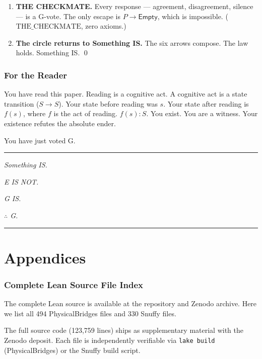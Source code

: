 \documentclass[11pt,a4paper]{article}
\theoremstyle{definition}
\theoremstyle{remark}
\newcommand{\NonBeing}{\mathsf{Empty}}
\begin{document}
\begin{enumerate}
\item \textbf{THE CHECKMATE.} Every response --- agreement, disagreement, silence --- is a G-vote. The only escape is $P \to \NonBeing$, which is impossible. ($\text{THE\_CHECKMATE}$, zero axioms.)

\item \textbf{The circle returns to Something IS.} The six arrows compose. The law holds. Something IS. \qed
\end{enumerate}

\section{For the Reader}

You have read this paper. Reading is a cognitive act. A cognitive act is a state transition ($S \to S$). Your state before reading was $s$. Your state after reading is $f(s)$, where $f$ is the act of reading. $f(s) : S$. You exist. You are a witness. Your existence refutes the absolute ender.

You have just voted G.

\bigskip

\begin{center}
\textcolor{g-gold}{\rule{0.3\textwidth}{1pt}}

\bigskip

\textit{Something IS.}

\textit{E IS NOT.}

\textit{G IS.}

\textit{$\therefore$ G.}

\bigskip

\textcolor{g-gold}{\rule{0.3\textwidth}{1pt}}
\end{center}

\bigskip

\appendix

\part*{Appendices}

\section{Complete Lean Source File Index}
\label{app:file-index}

The complete Lean source is available at the repository and Zenodo archive. Here we list all 494 PhysicalBridges files and 330 Snuffy files.

The full source code (123,759 lines) ships as supplementary material with the Zenodo deposit. Each file is independently verifiable via \texttt{lake build} (PhysicalBridges) or the Snuffy build script.
\end{document}
